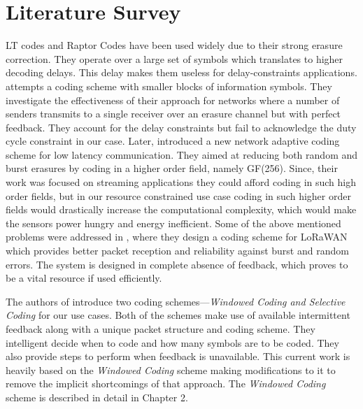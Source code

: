 \newpage
\section{Literature Survey}
\label{LiteratureSurvey}

LT codes \cite{ltcode} and Raptor Codes \cite{raptor} have been used widely due to their strong erasure correction. They operate over a large set of symbols which translates to higher decoding delays. This delay makes them useless for delay-constraints applications. \cite{DRINEA2013100} attempts a coding scheme with smaller blocks of information symbols. They investigate the effectiveness of their approach for networks where a number of senders transmits to a single receiver over an erasure channel but with perfect feedback. They account for the delay constraints but fail to acknowledge the duty cycle constraint in our case. Later,\cite{Fong} introduced a new network adaptive coding scheme for low latency communication. They aimed at reducing both random and burst erasures by coding in a higher order field, namely GF(256). Since, their work was focused on streaming applications they could afford coding in such high order fields, but in our resource constrained use case coding in such higher order fields would drastically increase the computational complexity, which would make the sensors power hungry and energy inefficient. Some of the above mentioned problems were addressed in \cite{DaRe}, where they design a coding scheme for LoRaWAN which provides better packet reception and reliability against burst and random errors. The system is designed in complete absence of feedback, which proves to be a vital resource if used efficiently.

The authors of \cite{borkotokyicc} introduce two coding schemes---\textit{Windowed Coding and Selective Coding} for our use cases. Both of the schemes make use of available intermittent feedback along with a unique packet structure and coding scheme. They intelligent decide when to code and how many symbols are to be coded. They also provide steps to perform when feedback is unavailable. This current work is heavily based on the \textit{Windowed Coding} scheme making modifications to it to remove the implicit shortcomings of that approach. The \textit{Windowed Coding} scheme is described in detail in Chapter 2. 


